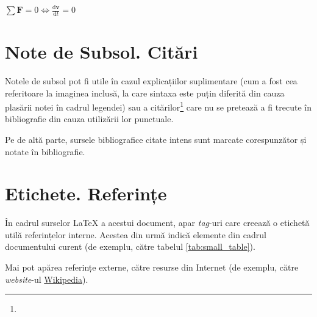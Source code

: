 \documentclass[../../main.tex]{subfiles}
\begin{document}
\newpage

$ \sum \mathbf{F} = 0 \Leftrightarrow {\frac {\mathrm{d} \mathbf{v}}{\mathrm{d} t}} = 0 $

\section{Note de Subsol. Citări}

Notele de subsol pot fi utile în cazul explicațiilor suplimentare (cum a fost cea referitoare la imaginea inclusă, la care sintaxa este puțin diferită din cauza plasării notei în cadrul legendei) sau a citărilor\footnote{} care nu se pretează a fi trecute în bibliografie din cauza utilizării lor punctuale.

Pe de altă parte, sursele bibliografice citate intens \cite{cloud_crypto} sunt marcate corespunzător și notate în bibliografie.

\section{Etichete. Referințe}

În cadrul surselor \LaTeX{} a acestui document, apar \textit{tag}-uri  care creează o etichetă utilă referințelor interne. Acestea din urmă indică elemente din cadrul documentului curent (de exemplu, către tabelul \ref{tab:small_table}).

Mai pot apărea referințe externe, către resurse din Internet (de exemplu, către \textit{website}-ul \href{https://www.wikipedia.org/}{Wikipedia}).
\end{document}
